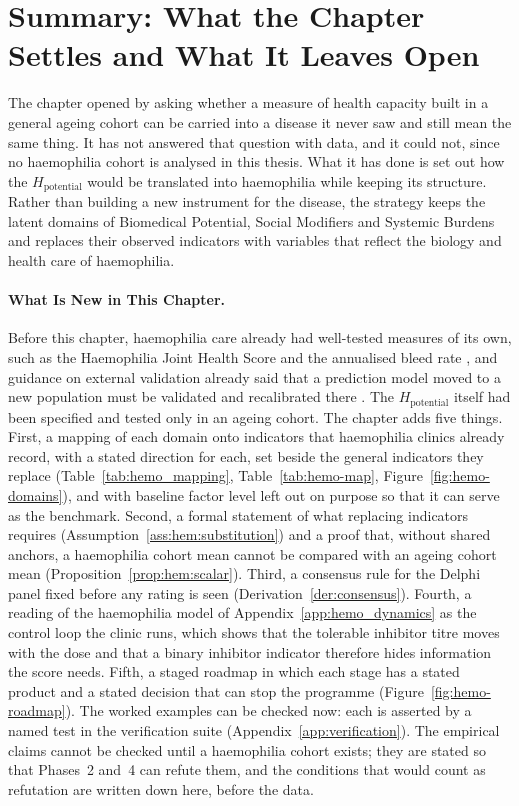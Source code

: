\section{Summary: What the Chapter Settles and What It Leaves Open}
\label{sec:hemo_close}

\noindent The chapter opened by asking whether a measure of health capacity built in a general ageing cohort can be carried into a disease it never saw and still mean the same thing. It has not answered that question with data, and it could not, since no haemophilia cohort is analysed in this thesis. What it has done is set out how the $H_{\text{potential}}$ would be translated into haemophilia while keeping its structure. Rather than building a new instrument for the disease, the strategy keeps the latent domains of Biomedical Potential, Social Modifiers and Systemic Burdens and replaces their observed indicators with variables that reflect the biology and health care of haemophilia.

\paragraph{What Is New in This Chapter.} Before this chapter, haemophilia care already had well-tested measures of its own, such as the Haemophilia Joint Health Score and the annualised bleed rate \citep{hilliard_2006}, and guidance on external validation already said that a prediction model moved to a new population must be validated and recalibrated there \citep{moons_2019,collins_2024}. The $H_{\text{potential}}$ itself had been specified and tested only in an ageing cohort. The chapter adds five things. First, a mapping of each domain onto indicators that haemophilia clinics already record, with a stated direction for each, set beside the general indicators they replace (Table~\ref{tab:hemo_mapping}, Table~\ref{tab:hemo-map}, Figure~\ref{fig:hemo-domains}), and with baseline factor level left out on purpose so that it can serve as the benchmark. Second, a formal statement of what replacing indicators requires (Assumption~\ref{ass:hem:substitution}) and a proof that, without shared anchors, a haemophilia cohort mean cannot be compared with an ageing cohort mean (Proposition~\ref{prop:hem:scalar}). Third, a consensus rule for the Delphi panel fixed before any rating is seen (Derivation~\ref{der:consensus}). Fourth, a reading of the haemophilia model of Appendix~\ref{app:hemo_dynamics} as the control loop the clinic runs, which shows that the tolerable inhibitor titre moves with the dose and that a binary inhibitor indicator therefore hides information the score needs. Fifth, a staged roadmap in which each stage has a stated product and a stated decision that can stop the programme (Figure~\ref{fig:hemo-roadmap}). The worked examples can be checked now: each is asserted by a named test in the verification suite (Appendix~\ref{app:verification}). The empirical claims cannot be checked until a haemophilia cohort exists; they are stated so that Phases~2 and~4 can refute them, and the conditions that would count as refutation are written down here, before the data.

